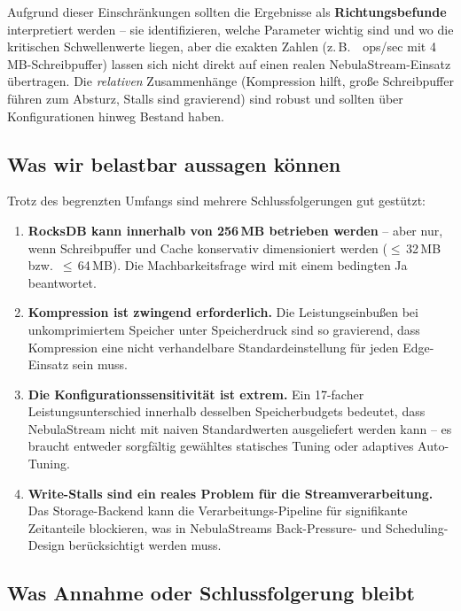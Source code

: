 \documentclass[11pt,a4paper]{scrartcl}
\begin{document}
Aufgrund dieser Einschränkungen sollten die Ergebnisse als
\textbf{Richtungsbefunde} interpretiert werden -- sie identifizieren, welche
Parameter wichtig sind und wo die kritischen Schwellenwerte liegen, aber die
exakten Zahlen (z.\,B.\ ~ops/sec mit 4\,MB-Schreibpuffer\grqq)
lassen sich nicht direkt auf einen realen NebulaStream-Einsatz übertragen. Die
\emph{relativen} Zusammenhänge (Kompression hilft, große Schreibpuffer führen
zum Absturz, Stalls sind gravierend) sind robust und sollten über
Konfigurationen hinweg Bestand haben.

\subsection{Was wir belastbar aussagen können}

Trotz des begrenzten Umfangs sind mehrere Schlussfolgerungen gut gestützt:

\begin{enumerate}
  \item \textbf{RocksDB kann innerhalb von 256\,MB betrieben werden} -- aber
        nur, wenn Schreibpuffer und Cache konservativ dimensioniert werden
        ($\leq$\,32\,MB bzw.\ $\leq$\,64\,MB). Die Machbarkeitsfrage wird mit
        einem bedingten \glqq Ja\grqq{} beantwortet.
  \item \textbf{Kompression ist zwingend erforderlich.} Die
        Leistungseinbußen bei unkomprimiertem Speicher unter Speicherdruck
        sind so gravierend, dass Kompression eine nicht verhandelbare
        Standardeinstellung für jeden Edge-Einsatz sein muss.
  \item \textbf{Die Konfigurationssensitivität ist extrem.} Ein 17-facher
        Leistungsunterschied innerhalb desselben Speicherbudgets bedeutet, dass
        NebulaStream nicht mit naiven Standardwerten ausgeliefert werden kann --
        es braucht entweder sorgfältig gewähltes statisches Tuning oder
        adaptives Auto-Tuning.
  \item \textbf{Write-Stalls sind ein reales Problem für die
        Streamverarbeitung.} Das Storage-Backend kann die
        Verarbeitungs-Pipeline für signifikante Zeitanteile blockieren, was in
        NebulaStreams Back-Pressure- und Scheduling-Design berücksichtigt werden
        muss.
\end{enumerate}

\subsection{Was Annahme oder Schlussfolgerung bleibt}
\end{document}
